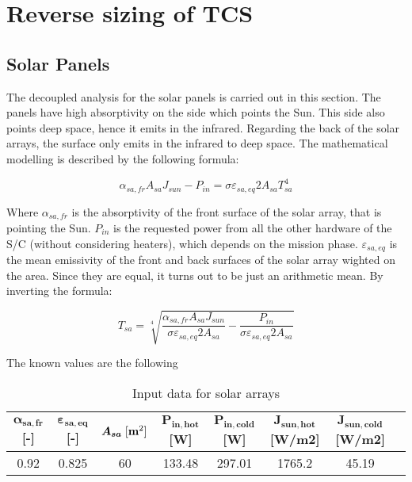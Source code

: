 \section{Reverse sizing of TCS}
\label{sec:TCS_sizing}

\subsection{Solar Panels}
\label{subsec: solar_panels}

The decoupled analysis for the solar panels is carried out in this section. The panels have high absorptivity on the side which points the Sun. This side also points deep space, hence it emits in the infrared. Regarding the back of the solar arrays, the surface only emits in the infrared to deep space.
The mathematical modelling is described by the following formula:

\begin{equation}
    \alpha_{sa,fr}A_{sa} J_{sun} - P_{in} = \sigma \varepsilon_{sa,eq}2 A_{sa}T_{sa}^4
\end{equation}

Where $\alpha_{sa,fr}$ is the absorptivity of the front surface of the solar array, that is pointing the Sun. $P_{in}$ is the requested power from all the other hardware of the S/C (without considering heaters), which depends on the mission phase. $\varepsilon_{sa,eq}$ is the mean emissivity of the front and back surfaces of the solar array wighted on the area. Since they are equal, it turns out to be just an arithmetic
mean. By inverting the formula:

\begin{equation}
    T_{sa} = \sqrt [4] {\frac{\alpha_{sa,fr}A_{sa} J_{sun}}{\sigma  \varepsilon_{sa,eq}2 A_{sa}} - \frac{P_{in}}{\sigma  \varepsilon_{sa,eq}2 A_{sa}}}
\end{equation}

The known values are the following

\begin{table}[H]
    \renewcommand{\arraystretch}{1.3}
    \centering
    \begin{tabular}{|c|c|c|c|c|c|c|c|}
        \hline
        $\boldsymbol{\alpha_{sa,fr}}$ [-] & $\boldsymbol{\varepsilon_{sa,eq}}$ [-] & $\boldsymbol{A_{sa}}\;[\textrm{\textbf{m}}^2]$ & $\boldsymbol{P_{in,hot}}$ [W] & $\boldsymbol{P_{in,cold}}$ [W] & $\boldsymbol{J_{sun,hot}}$ [W/m2] & $\boldsymbol{J_{sun,cold}}$ [W/m2]\\
        \hline
        0.92 & 0.825 & 60 &  133.48 & 297.01 & 1765.2 & 45.19 \\
        \hline
    \end{tabular}
    \caption{Input data for solar arrays}
    \label{table:sa_data}
\end{table}

